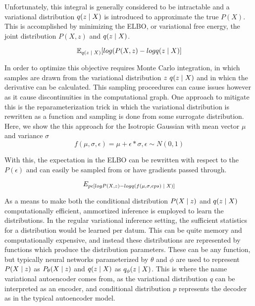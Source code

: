 Unfortunately, this integral is generally considered to be intractable and a variational distribution $q(z \; | \;{X})$ is introduced to approximate the true $P(X)$. This is accomplished by minimizing the \ac{ELBO}, or variational free energy, the joint distribution $P(X, z)$ and $q(z \; | \;{X})$. 

\begin{equation}
	\operatorname{\mathbb{E}}_{q(z \; | \;{X})} [ log(P(X, z) - log q(z \; | \;{X})] 
\end{equation}


In order to optimize this objective requires Monte Carlo integration, in which samples are drawn from the variational distribution $z ~ q(z \; | \;{X})$ and in whicn the derivative can be calculated. This sampling proceedures can cause issues however as it cause discontinuities in the computational graph. One approach to mitigate this is the reparameterization trick \cite{kingma2014autoencodingVB,rezende2014stochasticBackprop} in which the variational distribution  is rewritten as a function and sampling is done from some surrogate distribution. Here, we show the this approach for the Isotropic Gaussian with mean vector $\mu$ and variance $\sigma$
\begin{equation}
	f(\mu, \sigma, \epsilon) = \mu + \epsilon * \sigma, \epsilon \sim N(0, 1)
\end{equation}

With this, the expectation in the \ac{ELBO} can be rewritten with respect to the $P(\epsilon)$ and can easily be sampled from or have gradients passed through.

\begin{equation}
	E_{p{\epsilon} [ log P(X, z) - log q( f(\mu, \sigma, eps) \; | \;{X})]}
\end{equation}

As a means to make both the conditional distribution $P(X \; | \;{z})$ and $q(z \; | \;{X})$ computationally efficient, ammortized inference  is employed to learn the distributions. In the regular variational inference setting, the sufficient statistics for a distribution would be learned per datum. This can be quite memory and computationally expensive, and instead these distributions are represented by functions which produce the distribution parameters. These can be any function, but typically neural networks parameterized by $\theta$ and $\phi$ are used to represent $P(X \; | \;{z})$ as $P_{\theta}(X \; | \;{z})$ and $q(z \; | \;{X})$ as $q_{\phi}(z \; | \;{X})$. This is where the name variational autoencoder comes from, as the variational distribution $q$ can be interpreted as an encoder, and conditional distribution $p$ represents the decoder as in the typical autoencoder model. 

